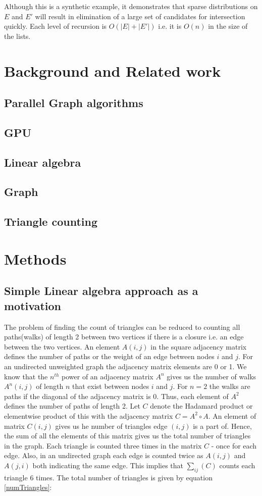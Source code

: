 \documentclass[conference]{IEEEtran}
\begin{document}
Although this is a synthetic example, it demonstrates that sparse distributions on $E$ and $E'$ will result in elimination of a large set of candidates for intersection quickly. Each level of recursion is $O(|E|+|E'|)$ i.e. it is $O(n)$ in the size of the lists.

\section{Background and Related work}
\subsection{Parallel Graph algorithms}
\subsection{GPU}
\subsection{Linear algebra}
\subsection{Graph}
\subsection{Triangle counting}

\section{Methods}
\subsection{Simple Linear algebra approach as a motivation}
The problem of finding the count of triangles can be reduced to counting all paths(walks) of length 2 between two vertices if there is a closure i.e. an edge between the two vertices. An element $A(i,j)$ in the square adjacency matrix defines the number of paths or the weight of an edge between nodes $i$ and $j$. For an undirected unweighted graph the adjacency matrix elements are 0 or 1. We know that the $n^{th}$ power of an adjacency matrix $A^n$ gives us the number of walks $A^n(i,j)$ of length $n$ that exist between nodes $i$ and $j$. For $n=2$ the walks are paths if the diagonal of the adjacency matrix is 0. Thus, each element of $A^2$ defines the number of paths of length 2. Let $C$ denote the Hadamard product or elementwise product of this with the adjacency matrix $C=A^2\circ A$. An element of matrix $C(i,j)$ gives us he number of triangles edge $(i,j)$ is a part of. Hence, the sum of all the elements of this matrix gives us the total number of triangles in the graph. Each triangle is counted three times in the matrix $C$ - once for each edge. Also, in an undirected graph each edge is counted twice as $A(i,j)$ and $A(j,i)$ both indicating the same edge. This implies that $\sum_{ij}(C)$ counts each triangle $6$ times. The total number of triangles is given by equation \ref{numTriangles}:
\end{document}
